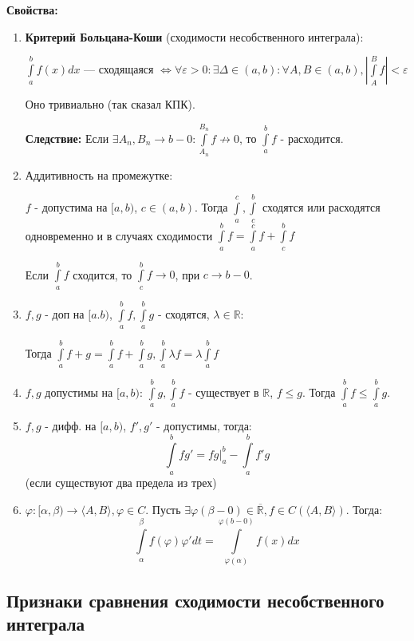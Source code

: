 \documentclass{article}
\newcommand{\integral}[2]{\displaystyle\int\limits_{#1}^{#2}}
\begin{document}
\textbf{Свойства:}
\begin{enumerate}
    \item \textbf{Критерий Больцана-Коши} (сходимости несобственного интеграла):
  
  $\integral{a}{b}f(x)dx$ --- сходящаяся $\Leftrightarrow \forall \varepsilon >0:\exists \Delta \in (a,b): \forall A,B\in (a,b),  |\integral{A}{B}f|< \varepsilon$
  
  Оно тривиально (так сказал КПК).

  \textbf{Следствие:} Если $\exists A_n,B_n \rightarrow b-0: \integral{A_n}{B_n}f \not \rightarrow 0$, то $\integral{a}{b}f$ - расходится.

  \item Аддитивность на промежутке:

$f$ - допустима на $[a,b)$, $c \in (a,b)$. Тогда $\integral{a}{c}, \integral{c}{b}$ сходятся или расходятся одновременно и в случаях сходимости $\integral{a}{b}f = \integral{a}{c}f + \integral{c}{b}f$

Если $\integral{a}{b}f$ сходится, то $\integral{c}{b} f \rightarrow 0$, при $c\rightarrow b - 0$.

\item $f,g$ - доп на $[a.b)$, $\integral{a}{b}f,\integral{a}{b}g$ - сходятся, $\lambda\in \mathbb{R}:$

Тогда $\integral{a}{b}f +g = \integral{a}{b}f + \integral{a}{b}g, \integral{a}{b}\lambda f = \lambda \integral{a}{b}f$

\item  $f,g$ допустимы на $[a,b)$: $\integral{a}{b}g,\integral{a}{b}f$ - существует в $\mathbb{R}$, $f\leq g$. Тогда $\integral{a}{b}f \leq \integral{a}{b}g$.

\item $f,g$ - дифф. на $[a,b)$, $f',g'$ - допустимы, тогда:
$$\integral{a}{b}fg' = fg\Big|_a^b - \integral{a}{b}f'g$$
(если существуют два предела из трех)

\item $\varphi: [\alpha, \beta) \rightarrow \langle A, B \rangle, \varphi \in C.$ Пусть $\exists \varphi(\beta-0)\in \overline{\mathbb{R}}, f\in C(\langle A,B\rangle)$. Тогда:
$$\integral{\alpha}{\beta}f(\varphi)\varphi'dt = \integral{\varphi(\alpha)}{\varphi(b-0)}f(x) dx$$

\end{enumerate}


\subsection{Признаки сравнения сходимости несобственного интеграла}
\end{document}
